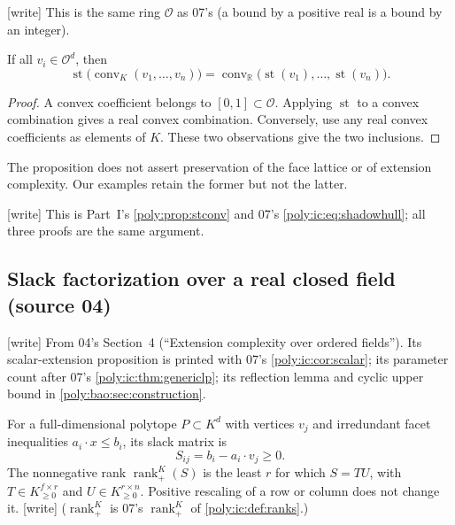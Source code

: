 \documentclass[11pt,a4paper]{article}
\numberwithin{equation}{section}
\theoremstyle{plain}
\newcommand{\wtag}{\textup{[write]}}%
\newcommand{\R}{\mathbb R}
\newcommand{\st}{\operatorname{st}}
\newcommand{\conv}{\operatorname{conv}}
\newcommand{\OO}{\mathcal O}
\newcommand{\nrk}{\operatorname{rank}_{+}}
\newcommand{\rankp}{\operatorname{rank}_{+}}
\begin{document}
\wtag{} This is the same ring $\OO$ as 07's (a bound by a positive real is
a bound by an integer).

\begin{proposition}\label{poly:bao:prop:stconv}
If all $v_i\in\OO^d$, then
\[
 \st\bigl(\conv_K(v_1,\ldots,v_n)\bigr)
 =\conv_\R\bigl(\st(v_1),\ldots,\st(v_n)\bigr).
\]
\end{proposition}
\begin{proof}
A convex coefficient belongs to $[0,1]\subset\OO$. Applying $\st$ to a
convex combination gives a real convex combination. Conversely, use any
real convex coefficients as elements of $K$. These two observations give
the two inclusions.
\end{proof}
The proposition does not assert preservation of the face lattice or of
extension complexity. Our examples retain the former but not the latter.

\wtag{} This is Part~I's \cref{poly:prop:stconv} and 07's
\eqref{poly:ic:eq:shadowhull}; all three proofs are the same argument.

\subsection{Slack factorization over a real closed field (source 04)}\label{poly:bao:sec:xc}
\wtag{} From 04's Section~4 (``Extension complexity over ordered
fields''). Its scalar-extension proposition is printed with 07's
\cref{poly:ic:cor:scalar}; its parameter count after 07's
\cref{poly:ic:thm:genericlp}; its reflection lemma and cyclic upper bound in
\cref{poly:bao:sec:construction}.

For a full-dimensional polytope $P\subset K^d$ with vertices $v_j$ and
irredundant facet inequalities $a_i\cdot x\leq b_i$, its slack matrix is
\[
 S_{ij}=b_i-a_i\cdot v_j\geq0.
\]
The nonnegative rank $\nrk^K(S)$ is the least $r$ for which $S=TU$, with
$T\in K_{\geq0}^{f\times r}$ and $U\in K_{\geq0}^{r\times n}$.
Positive rescaling of a row or column does not change it.
\wtag{} ($\nrk^K$ is 07's $\rankp^K$ of \cref{poly:ic:def:ranks}.)
\end{document}
